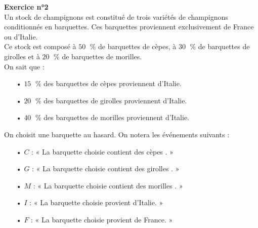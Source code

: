 \newpage

\textbf{Exercice n°2} \\

Un stock de champignons est constitué de trois variétés de champignons conditionnés en barquettes. Ces barquettes proviennent exclusivement de France ou d'Italie. \\

Ce stock est composé à $50 \;$ \% de barquettes de cèpes, à $30 \;$ \% de barquettes de girolles et à $20 \;$ \% de barquettes de morilles. \\

On sait que : \\

\begin{itemize}
\item[•] $15 \;$ \% des barquettes de cèpes proviennent d'Italie. 
\item[•] $20 \;$ \% des barquettes de girolles proviennent d'Italie. 
\item[•] $40 \;$ \% des barquettes de morilles proviennent d'Italie. 
\end{itemize}

\vspace*{.3cm}

On choisit une barquette au hasard. On notera les événements suivants : \\

\begin{itemize}
\item[•] $C$ : « La barquette choisie contient des cèpes . » 
\item[•] $G$ : « La barquette choisie contient des girolles . » 
\item[•] $M$ : « La barquette choisie contient des morilles . » 
\item[•] $I$ : « La barquette choisie provient d'Italie. » 
\item[•] $F$ : « La barquette choisie provient de France. » 
\end{itemize}

\vspace*{.3cm}


